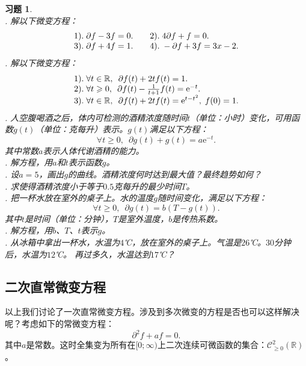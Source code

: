 \documentclass[12pt,UTF8]{ctexbook}
\newcommand{\e}{\mathrm{e}}
\theoremstyle{definition}
\theoremstyle{plain}
\newtheorem{xt}{习题}[section]
\begin{document}
\begin{xt}
    \mbox{} \\
    . 解以下微变方程：\\
    $$
    \begin{array}[]{ll}
        1).\;\partial f - 3 f = 0. &\quad2).\; 4\partial f + f = 0. \\
        3).\;\partial f + 4 f = 1. &\quad4).\; -\partial f + 3 f = 3x - 2. 
    \end{array}
    $$
    . 解以下微变方程：\\
    $$
    \begin{array}[]{l}
        1).\;\forall t\in \mathbb{R},\,\,\,\partial f(t) + 2 t f(t) = 1. \\
        2).\;\forall t \geqslant 0,\,\,\,\partial f(t) - \frac{1}{t + 1} f(t) = \e^{-t}. \\
        3).\;\forall t\in \mathbb{R},\,\,\,\partial f(t) + 2t f(t) =\e^{t - t^2}, \; f(0) = 1. 
    \end{array}
    $$
    . 人空腹喝酒之后，体内可检测的酒精浓度随时间$t$（单位：小时）变化，可用函数$g(t)$（单位：克每升）表示。$g(t)$满足以下方程：
    $$ \forall t\geqslant 0,\,\,\,\partial g(t) + g(t) = a \e^{-t}.$$
    其中常数$a$表示人体代谢酒精的能力。\\
    . 解方程，用$a$和$t$表示函数$g$。\\
    . 设$a = 5$，画出$g$的曲线。酒精浓度何时达到最大值？最终趋势如何？\\
    . 求使得酒精浓度小于等于$0.5$克每升的最少时间$T$。\\
    . 把一杯水放在室外的桌子上。水的温度$g$随时间变化，满足以下方程：
    $$ \forall t\geqslant 0,\,\,\,\partial g(t) = b(T - g(t)).$$
    其中$t$是时间（单位：分钟），$T$是室外温度，$b$是传热系数。\\
    . 解方程，用$b$、$T$、$t$表示$g$。\\
    . 从冰箱中拿出一杯水，水温为$4$℃，放在室外的桌子上。气温是$26$℃。$30$分钟后，水温为$12$℃。
    再过多久，水温达到$17$℃？
\end{xt}

\subsection{二次直常微变方程}
以上我们讨论了一次直常微变方程。涉及到多次微变的方程是否也可以这样解决呢？考虑如下的常微变方程：
\begin{equation}
    \partial^2 f + a f = 0. \label{2-2d}
\end{equation}
其中$a$是常数。这时全集变为所有在$[0;\infty)$上二次连续可微函数的集合：$\mathcal{C}^2_{\geqslant 0}(\mathbb{R})$。
\end{document}
